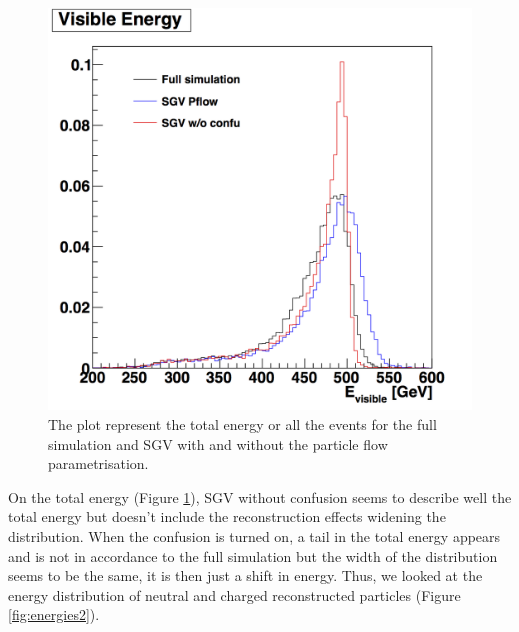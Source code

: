 \begin{figure}[t]
  \centering
  \includegraphics[scale=0.4]{chap6/fig_SGV/Evis.png}
  \caption{The plot represent the total energy or all the events for the full simulation and SGV with and without the particle flow parametrisation.}
  \label{fig:energy}
\end{figure}

On the total energy (Figure \ref{fig:energy}), SGV without confusion seems to describe well the total energy but doesn't include the reconstruction effects widening the distribution. When the confusion is turned on, a tail in the total energy appears and is not in accordance to the full simulation but the width of the distribution seems to be the same, it is then just a shift in energy. Thus, we looked at the energy distribution of neutral and charged reconstructed particles (Figure \ref{fig:energies2}).

